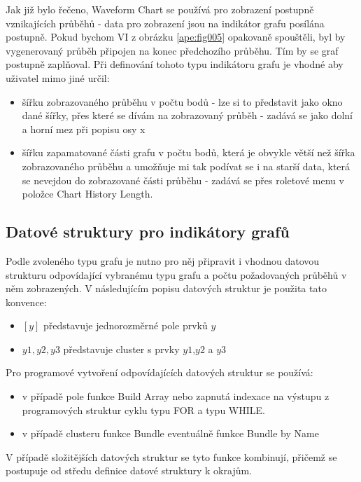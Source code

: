 
     Jak již bylo řečeno, Waveform Chart se používá pro zobrazení postupně vznikajících průběhů -
     data pro zobrazení jsou na indikátor grafu posílána postupně. Pokud bychom VI z obrázku
     \ref{ape:fig005} opakovaně spouštěli, byl by vygenerovaný průběh připojen
     na konec předchozího průběhu. Tím by se graf postupně zaplňoval. Při definování tohoto
     typu indikátoru grafu je vhodné aby uživatel mimo jiné určil:
     \begin{itemize}[noitemsep]
       \item šířku zobrazovaného průběhu v počtu bodů - lze si to představit jako okno dané šířky,
             přes které se dívám na zobrazovaný průběh - zadává se jako dolní a horní mez při popisu
             osy x
       \item šířku zapamatované části grafu v počtu bodů, která je obvykle větší než šířka
             zobrazovaného průběhu a umožňuje mi tak podívat se i na starší data, která se nevejdou
             do zobrazované části průběhu - zadává se přes roletové menu v položce Chart History
             Length. 
     \end{itemize}
     
   \subsection{Datové struktury pro indikátory grafů}
     

     Podle zvoleného typu grafu je nutno pro něj připravit i vhodnou datovou strukturu odpovídající
     vybranému typu grafu a počtu požadovaných průběhů v něm zobrazených. V následujícím popisu
     datových struktur je použita tato konvence:
     
     \begin{itemize}[noitemsep]
       \item \([y]\) představuje jednorozměrné pole prvků \(y\)
       \item \({y1,y2,y3}\) představuje cluster s prvky \(y1\),\(y2\) a \(y3\) 
     \end{itemize} 
     Pro programové vytvoření odpovídajících datových struktur se používá:
     \begin{itemize}[noitemsep]
       \item v případě pole funkce Build Array nebo zapnutá indexace na výstupu z programových
             struktur cyklu typu FOR a typu WHILE. 
       \item v případě clusteru funkce Bundle eventuálně funkce Bundle by Name
     \end{itemize}

     V případě složitějších datových struktur se tyto funkce kombinují, přičemž se postupuje od
     středu definice datové struktury k okrajům.        
        
